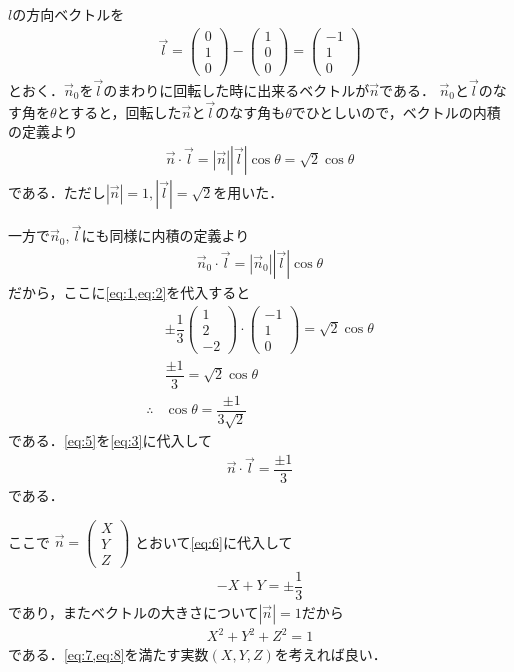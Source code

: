\documentclass[../../main.tex]{subfiles}
\begin{document}
$l$の方向ベクトルを
\begin{align}
  \vec{l} =
  \begin{pmatrix}0\\1\\0
  \end{pmatrix}-
  \begin{pmatrix}1\\0\\0
  \end{pmatrix}=
  \begin{pmatrix}-1\\1\\0
  \end{pmatrix}\label{eq:2}
\end{align}
とおく．$\vec{n}_0$を$\vec{l}$のまわりに回転した時に出来るベクトルが$\vec{n}$である．
$\vec{n}_0$と$\vec{l}$のなす角を$\theta$とすると，回転した$\vec{n}$と$\vec{l}$のなす角も$\theta$でひとしいので，ベクトルの内積の定義より
\begin{align}
  \vec{n} \cdot \vec{l} = |\vec{n}||\vec{l}|\cos\theta = \sqrt{2}\cos\theta \label{eq:3}
\end{align}
である．ただし$|\vec{n}|=1,|\vec{l}|=\sqrt{2}$を用いた．

一方で$\vec{n}_0,\vec{l}$にも同様に内積の定義より
\begin{align}
  \vec{n}_0\cdot\vec{l} = |\vec{n}_0||\vec{l}|\cos\theta \label{eq:4}
\end{align}
だから，ここに\cref{eq:1,eq:2}を代入すると
\begin{align}
  & \pm\dfrac{1}{3}
  \begin{pmatrix}1\\2\\-2
  \end{pmatrix}\cdot
  \begin{pmatrix}-1\\1\\0
  \end{pmatrix} = \sqrt{2}\cos\theta \\
  & \dfrac{\pm 1}{3} = \sqrt{2}\cos\theta \\
  \therefore
  & \cos\theta = \dfrac{\pm1}{3\sqrt{2}} \label{eq:5}
\end{align}
である．\cref{eq:5}を\cref{eq:3}に代入して
\begin{align}
  \vec{n} \cdot \vec{l} = \dfrac{\pm 1}{3} \label{eq:6}
\end{align}
である．

ここで
$\vec{n}=
\begin{pmatrix}X\\Y\\Z
\end{pmatrix}$
とおいて\cref{eq:6}に代入して
\begin{align}
  -X+Y=\pm\dfrac{1}{3} \label{eq:7}
\end{align}
であり，またベクトルの大きさについて$|\vec{n}|=1$だから
\begin{align}
  X^2+Y^2+Z^2=1 \label{eq:8}
\end{align}
である．\cref{eq:7,eq:8}を満たす実数$(X,Y,Z)$を考えれば良い．
\end{document}
